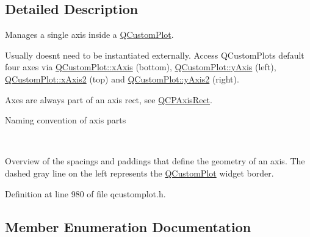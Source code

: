 \subsection{Detailed Description}
Manages a single axis inside a \hyperlink{class_q_custom_plot}{Q\+Custom\+Plot}. 

Usually doesn\textquotesingle{}t need to be instantiated externally. Access Q\+Custom\+Plot\textquotesingle{}s default four axes via \hyperlink{class_q_custom_plot_a9a79cd0158a4c7f30cbc702f0fd800e4}{Q\+Custom\+Plot\+::x\+Axis} (bottom), \hyperlink{class_q_custom_plot_af6fea5679725b152c14facd920b19367}{Q\+Custom\+Plot\+::y\+Axis} (left), \hyperlink{class_q_custom_plot_ada41599f22cad901c030f3dcbdd82fd9}{Q\+Custom\+Plot\+::x\+Axis2} (top) and \hyperlink{class_q_custom_plot_af13fdc5bce7d0fabd640f13ba805c0b7}{Q\+Custom\+Plot\+::y\+Axis2} (right).

Axes are always part of an axis rect, see \hyperlink{class_q_c_p_axis_rect}{Q\+C\+P\+Axis\+Rect}.  \begin{center}Naming convention of axis parts\end{center}  ~\newline
  \begin{center}Overview of the spacings and paddings that define the geometry of an axis. The dashed gray line on the left represents the \hyperlink{class_q_custom_plot}{Q\+Custom\+Plot} widget border.\end{center}  

Definition at line 980 of file qcustomplot.\+h.



\subsection{Member Enumeration Documentation}
\hypertarget{class_q_c_p_axis_ae2bcc1728b382f10f064612b368bc18a}{}
